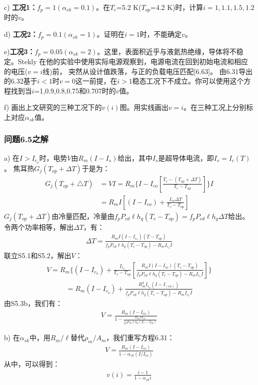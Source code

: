 c) \textbf{工况1：}$f_p=1(\alpha_{sk}=0.1)$。在$T_c$=5.2 K($T_{op}$=4.2 K)时，计算$i=1,1.1,1.5,1.2$
时的$v$。

d) \textbf{工况2：}$f_p=0.1(\alpha_{sk}=1)$。证明在$i=1$时，不能确定$v$。

e)\textbf{工况3：}$f_p=0.05(\alpha_{sk}=2)$。这里，表面积近乎与液氦热绝缘，导体将不稳定。Stekly
在他的实验中使用实际电源观察到，电源电流在回到初始电流和相应的电压($v=i$线)前，
突然从设计值跌落，与正的负载电压匹配[6.63]。
由6.31导出的6.32基于$i<1$时$v=0$这一前提，在$i>1$稳态工况下不成立。你可以使用这个方程找到当$i$=1,0.9,0.8,0.75和0.707时的$v$值。

f) 画出上文研究的三种工况下的$v(i)$图。用实线画出$v=i$。在三种工况上分别标上对应$\alpha_{sk}$值。


\subsubsection{问题6.5之解}
a) 在$I> I_{c_o}$时，电势$V$由$R_m(I-I_s)$给出，其中$I_s$是超导体电流，即$I_s=I_c(T)$。
焦耳热$G_j(T_{op}+\Delta T)$于是为：
\begin{align*}%
G_{j}(T_{op}+\triangle T)&=VI=R_m\{I-I_{co}[\frac{T_c-(T_{op}+\Delta T)}{T_c-T_{op}}]\}I\\
&=R_mI[(I-I_{co})+\frac{I_{co}\Delta T}{T_c-T_{op}}] \tag{S5.1}
\end{align*}
$G_j(T_{op}+\Delta T)$由冷量匹配，冷量由$f_pP_{cd}\ell h_q(T_c-T_{op})=f_pP_{cd}\ell h_q\Delta T$给出。
令两个功率相等，解出$\Delta T$，有：
\begin{align*}%
\Delta T=\frac{R_mI(I-I_{c_o})(T-T_{op})}{f_pP_{cd}\ell h_q(T_c-T_{op})-R_mI_{c_o}I} \tag{S5.2}
\end{align*}
联立S5.1和S5.2，解出$V$：
\begin{align*}%
V=R_m\{(I-I_{c_o})+\frac{I_{c_o}}{T_c-T_{op}}[\frac{R_mI(I-I_{co})(T_c-T_{op})}{f_pP_{cd}\ell h_q(T_c-T_{op})-R_mI_{c_o}I}]\} \tag{S5.3a}
\end{align*}
\begin{align*}%
=R_m(I-I_{c_o})+\frac{R_m^2I_{c_o}(I-I_(co))}{f_pP_{cd}\ell h_q(T_c-T_{op})-R_mI_{c_o}I} \tag{S5.3b}
\end{align*}
由S5.3b，我们有：
\begin{align*}%
V=\frac{R_m(I-I_{co})}{1-\frac{R_mII_{co}}{f_pP_{cd}\ell h_q(T_c-T_{op})}} \tag{6.31}
\end{align*}

b) 在$\alpha_{sk}$中，用$R_m/\ell$替代$\rho_m/A_m$，我们重写方程6.31：
\begin{align*}%
V=\frac{R_m(I-I_{co})}{1-\alpha_{sk}(I/I_{co})} \tag{S5.4}
\end{align*}
从中，可以得到：
\begin{align*}%
v(i)=\frac{i-1}{1-\alpha_{sk}i} \tag{6.32}
\end{align*}

